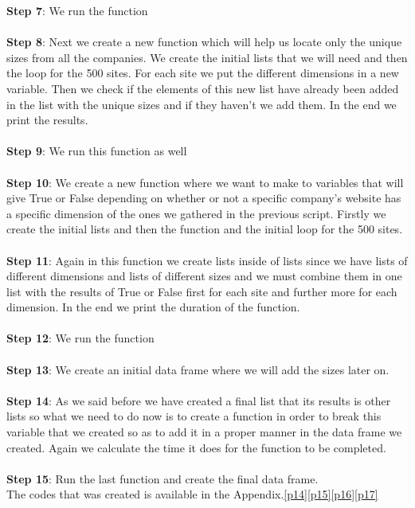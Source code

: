 \documentclass{book}
\begin{document}
\textbf{Step 7}: We run the function\\\\
\textbf{Step 8}: Next we create a new function which will help us locate only the unique sizes from all the companies. We create the initial lists that we will need and then the loop for the 500 sites. For each site we put the different dimensions in a new variable. Then we check if the elements of this new list have already been added in the list with the unique sizes and if they haven't we add them. In the end we print the results.\\\\
\textbf{Step 9}: We run this function as well\\\\
\textbf{Step 10}: We create a new function where we want to make to variables that will give True or False depending on whether or not a specific company's website has a specific dimension of the ones we gathered in the previous script. Firstly we create the initial lists and then the function and the initial loop for the 500 sites.\\\\
\textbf{Step 11}: Again in this function we create lists inside of lists since we have lists of different dimensions and lists of different sizes and we must combine them in one list with the results of True or False first for each site and further more for each dimension. In the end we print the duration of the function.\\\\
\textbf{Step 12}: We run the function\\\\
\textbf{Step 13}: We create an initial data frame where we will add the sizes later on.\\\\
\textbf{Step 14}: As we said before we have created a final list that its results is other lists so what we need to do now is to create a function in order to break this variable that we created so as to add it in a proper manner in the data frame we created. Again we calculate the time it does for the function to be completed.\\\\
\textbf{Step 15}: Run the last function and create the final data frame.\\
The codes that was created is available in the Appendix.\ref{p14}\ref{p15}\ref{p16}\ref{p17}                 
\end{document}
